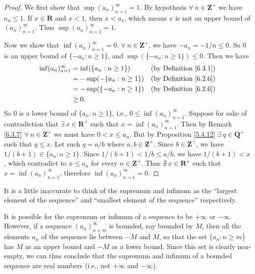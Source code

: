 \begin{proof}
    We first show that \(\sup(a_n)_{n = 1}^\infty = 1\).
    By hypothesis \(\forall\ n \in \mathbf{Z}^+\) we have \(a_n \leq 1\).
    If \(x \in \mathbf{R}\) and \(x < 1\), then \(x < a_1\), which means \(x\) is not an upper bound of \((a_n)_{n = 1}^\infty\).
    Thus \(\sup(a_n)_{n = 1}^\infty = 1\).

    Now we show that \(\inf(a_n)_{n = 1}^\infty = 0\).
    \(\forall\ n \in \mathbf{Z}^+\), we have \(-a_n = -1 / n \leq 0\).
    So \(0\) is an upper bound of \(\{-a_n : n \geq 1\}\), and \(\sup(\{-a_n : n \geq 1\}) \leq 0\).
    Then we have
    \begin{align*}
        \inf(a_n)_{n = 1}^\infty & = \inf(\{a_n : n \geq 1\})   & \text{(by Definition \ref{6.3.1})} \\
                                 & = -\sup(-\{a_n : n \geq 1\}) & \text{(by Definition \ref{6.2.6})} \\
                                 & = -\sup(\{-a_n : n \geq 1\}) & \text{(by Definition \ref{6.2.6})} \\
                                 & \geq 0.
    \end{align*}
    So \(0\) is a lower bound of \(\{a_n : n \geq 1\}\), i.e., \(0 \leq \inf(a_n)_{n = 1}^\infty\).
    Suppose for sake of contradiction that \(\exists\ x \in \mathbf{R}^+\) such that \(x = \inf(a_n)_{n = 1}^\infty\).
    Then by Remark \ref{6.3.7} \(\forall\ n \in \mathbf{Z}^+\) we must have \(0 < x \leq a_n\).
    But by Proposition \ref{5.4.12} \(\exists\ q \in \mathbf{Q}^+\) such that \(q \leq x\).
    Let such \(q = a / b\) where \(a, b \in \mathbf{Z}^+\).
    Since \(b \in \mathbf{Z}^+\), we have \(1 / (b + 1) \in \{a_n : n \geq 1\}\).
    Since \(1 / (b + 1) < 1 / b \leq a / b\), we have \(1 / (b + 1) < x\), which contradict to \(x \leq a_n\) for every \(n \in \mathbf{Z}^+\).
    Thus \(\nexists\ x \in \mathbf{R}^+\) such that \(x = \inf(a_n)_{n = 1}^\infty\), therefore \(\inf(a_n)_{n = 1}^\infty = 0\).
\end{proof}

\begin{note}
    It is a little inaccurate to think of the supremum and infimum as the ``largest element of the sequence'' and ``smallest element of the sequence'' respectively.
\end{note}

\begin{note}
    It is possible for the supremum or infimum of a sequence to be \(+\infty\) or \(-\infty\).
    However, if a sequence \((a_n)_{n = m}^\infty\) is bounded, say bounded by \(M\), then all the elements \(a_n\) of the sequence lie between \(-M\) and \(M\), so that the set \(\{a_n : n \geq m\}\) has \(M\) as an upper bound and \(-M\) as a lower bound.
    Since this set is clearly non-empty, we can thus conclude that the supremum and infimum of a bounded sequence are real numbers (i.e., not \(+\infty\) and \(-\infty\)).
\end{note}

